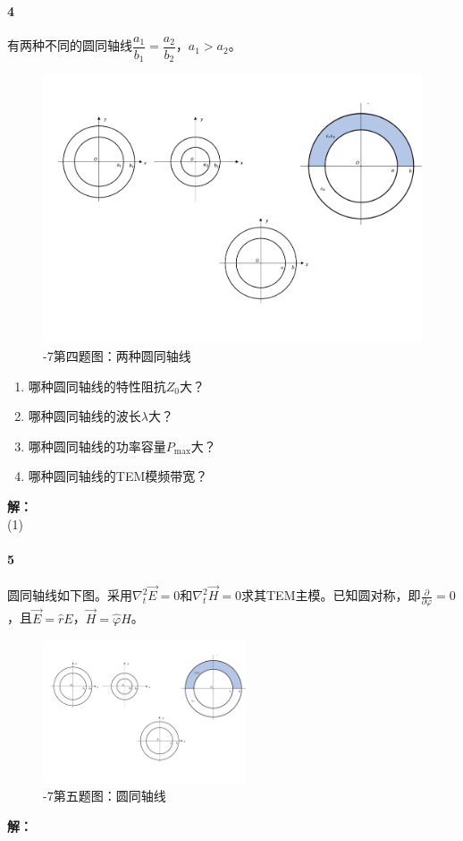     \paragraph{4}有两种不同的圆同轴线$\dfrac{a_1}{b_1}=\dfrac{a_2}{b_2}$，$a_1>a_2$。
    \begin{figure}[htp]
        \centering
        \includegraphics[width=12cm]{figure/appendix/2-7(4).pdf}
        \caption{-7第四题图：两种圆同轴线}\label{Fig: 2-7(4)}
    \end{figure}
    \begin{enumerate}
        \renewcommand*\labelenumi{(\theenumi)}
        \item 哪种圆同轴线的特性阻抗$Z_0$大？
        \item 哪种圆同轴线的波长$\lambda$大？
        \item 哪种圆同轴线的功率容量$P_\mathrm{max}$大？
        \item 哪种圆同轴线的TEM模频带宽？
    \end{enumerate}
    {\bfseries 解：}\\
    (1)


    \paragraph{5}圆同轴线如下图。采用$\nabla_t^2 \vec{E}=0$和$\nabla_t^2 \vec{H}=0$求其TEM主模。已知圆对称，即$\frac{\partial }{\partial \varphi}=0$，且$\vec{E}=\hat{r}E$，$\vec{H}=\hat{\varphi}H$。

    \begin{figure}[htp]
        \centering
        \includegraphics[width=6cm]{figure/appendix/2-7(5).pdf}
        \caption{-7第五题图：圆同轴线}\label{Fig: 2-7(5)}
    \end{figure}

    {\bfseries 解：}\\
